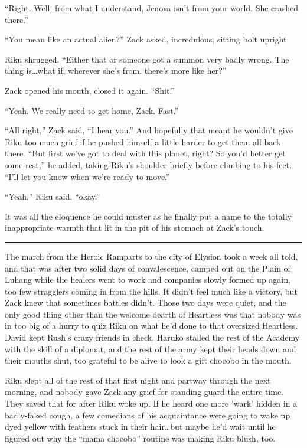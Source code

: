 ``Right. Well, from what I understand, Jenova isn't from your world. She crashed there.''

``You mean like an actual alien?'' Zack asked, incredulous, sitting bolt upright.

Riku shrugged. ``Either that or someone got a summon very badly wrong. The thing is\ldots what if, wherever she's from, there's more like her?''

Zack opened his mouth, closed it again. ``Shit.''

``Yeah. We really need to get home, Zack. Fast.''

``All right,'' Zack said, ``I hear you.'' And hopefully that meant he wouldn't give Riku too much grief if he pushed himself a little harder to get them all back there. ``But first we've got to deal with this planet, right? So you'd better get some rest,'' he added, taking Riku's shoulder briefly before climbing to his feet. ``I'll let you know when we're ready to move.''

``Yeah,'' Riku said, ``okay.''

It was all the eloquence he could muster as he finally put a name to the totally inappropriate warmth that lit in the pit of his stomach at Zack's touch.

\fancybreak{\pfbreakdisplay}


The march from the Heroic Ramparts to the city of Elysion took a week all told, and that was after two solid days of convalescence, camped out on the Plain of Luhang while the healers went to work and companies slowly formed up again, too few stragglers coming in from the hills. It didn't feel much like a victory, but Zack knew that sometimes battles didn't. Those two days were quiet, and the only good thing other than the welcome dearth of Heartless was that nobody was in too big of a hurry to quiz Riku on what he'd done to that oversized Heartless. David kept Rush's crazy friends in check, Haruko stalled the rest of the Academy with the skill of a diplomat, and the rest of the army kept their heads down and their mouths shut, too grateful to be alive to look a gift chocobo in the mouth.

Riku slept all of the rest of that first night and partway through the next morning, and nobody gave Zack any grief for standing guard the entire time. They saved that for after Riku woke up. If he heard one more 'wark' hidden in a badly-faked cough, a few comedians of his acquaintance were going to wake up dyed yellow with feathers stuck in their hair\ldots but maybe he'd wait until he figured out why the ``mama chocobo'' routine was making Riku blush, too.


